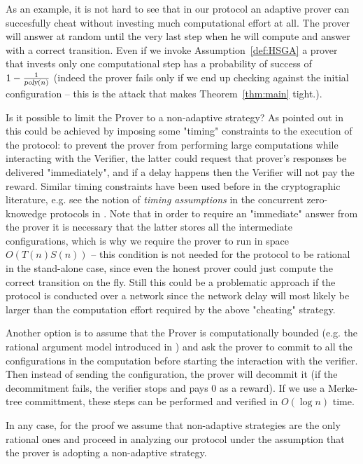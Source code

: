As an example, it is not hard to see that in our protocol an adaptive prover can 
succesfully cheat without investing much computational effort at all. The prover will answer at random until the very last step when he will compute and answer with a correct transition. Even if we invoke Assumption~\ref{def:HSGA} a prover that invests only one computational step has a probability of success of  $1-\frac{1}{{\textsl{poly}}(n)}$ (indeed the prover fails only if we end up checking against the initial configuration -- this is the attack that makes Theorem~\ref{thm:main} tight.). 

Is it possible to limit the Prover to a non-adaptive strategy? As pointed out in \cite{cg15} this could be achieved by imposing some "timing" constraints to the execution of the protocol: to prevent the prover from performing large computations while interacting with the Verifier, the latter could request that prover's responses be delivered "immediately", and if a delay happens then the Verifier will not pay the reward. Similar timing constraints have been used before in the cryptographic literature, e.g. see the notion of {\em timing assumptions} in the concurrent zero-knowedge protocols in \cite{dns}. Note that in order to require an "immediate" answer from the prover it is 
necessary that the latter stores all the intermediate configurations, which is why we require the prover to run in space $O(T(n)S(n))$ -- this condition is not needed for the protocol to be rational in the stand-alone case, since even the honest prover could just compute the correct transition on the fly. Still this could be a problematic approach if the protocol is conducted over a network since the network delay will most likely be larger than the computation effort required by the above "cheating" strategy. 

Another option is to assume that the Prover is computationally bounded (e.g. 
the rational argument model introduced in \cite{ratargs}) and ask the prover 
to commit to all the configurations in the computation before starting the interaction with the verifier. Then instead of sending the configuration, the prover will decommit it (if the decommitment fails, the verifier stops and pays 0 as a reward). If we use a Merke-tree 
committment, these steps can be performed and verified in $O(\log n)$ time. 

In any case, for the proof we assume that non-adaptive strategies are the only rational ones and proceed in analyzing our protocol 
under the assumption that the prover is adopting a non-adaptive strategy. 

